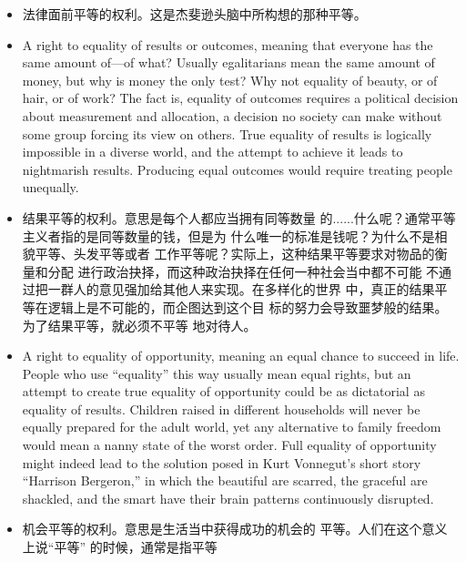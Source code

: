 \begin{paracol}{2}
\begin{itemize}
	\item 法律面前平等的权利。这是杰斐逊头脑中所构想的那种平等。
\end{itemize}
\switchcolumn*
\begin{itemize}	
	\item A right to equality of results or outcomes, meaning that
	everyone has the same amount of---of what? Usually egalitarians mean the same amount of money, but why is money
	the only test? Why not equality of beauty, or of hair, or of
	work? The fact is, equality of outcomes requires a political
	decision about measurement and allocation, a decision no society can make without some group forcing its view on others. True equality of results is logically impossible in a diverse
	world, and the attempt to achieve it leads to nightmarish results. Producing equal outcomes would require treating people unequally.
\end{itemize}
\switchcolumn
\begin{itemize}	
	\item 结果平等的权利。意思是每个人都应当拥有同等数量
	的......什么呢？通常平等主义者指的是同等数量的钱，但是为
	什么唯一的标准是钱呢？为什么不是相貌平等、头发平等或者
	工作平等呢？实际上，这种结果平等要求对物品的衡量和分配
	进行政治抉择，而这种政治抉择在任何一种社会当中都不可能
	不通过把一群人的意见强加给其他人来实现。在多样化的世界
	中，真正的结果平等在逻辑上是不可能的，而企图达到这个目
	标的努力会导致噩梦般的结果。为了结果平等，就必须不平等
	地对待人。
\end{itemize}
\switchcolumn*
\begin{itemize}
	\item A right to equality of opportunity, meaning an equal chance
	to succeed in life. People who use ``equality'' this way usually
	mean equal rights, but an attempt to create true equality of
	opportunity could be as dictatorial as equality of results.
	Children raised in different households will never be equally
	prepared for the adult world, yet any alternative to family
	freedom would mean a nanny state of the worst order. Full
	equality of opportunity might indeed lead to the solution
	posed in Kurt Vonnegut's short story ``Harrison Bergeron,''
	in which the beautiful are scarred, the graceful are shackled,
	and the smart have their brain patterns continuously disrupted.
\end{itemize}
\switchcolumn
\begin{itemize}
	\item  机会平等的权利。意思是生活当中获得成功的机会的
	平等。人们在这个意义上说“平等” 的时候，通常是指平等

\end{itemize}
\end{paracol}
